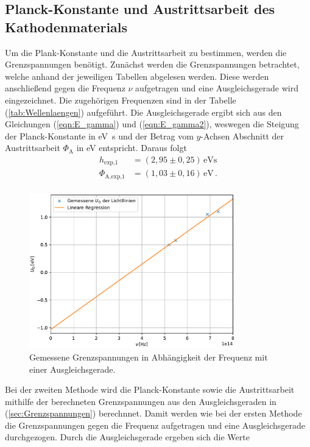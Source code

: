 \subsection{Planck-Konstante und Austrittsarbeit des Kathodenmaterials}
Um die Plank-Konstante und die Austrittsarbeit zu bestimmen, werden die Grenzspannungen benötigt.
Zunächst werden die Grenzspannungen betrachtet, welche anhand der jeweiligen Tabellen abgelesen werden. 
Diese werden anschließend gegen die Frequenz $\nu$ aufgetragen und eine Ausgleichsgerade wird eingezeichnet.
Die zugehörigen Frequenzen sind in der Tabelle (\ref{tab:Wellenlaengen}) aufgeführt.
Die Ausgleichsgerade ergibt sich aus den Gleichungen (\ref{eqn:E_gamma}) und (\ref{eqn:E_gamma2}), weswegen die Steigung der Planck-Konstante in 
\unit{\eV\second} und der Betrag vom $y$-Achsen Abschnitt der Austrittsarbeit $\Phi_{\text{A}}$ in \unit{\eV} entspricht. Daraus folgt
\begin{align*}
    h_{\text{exp,}1} &= (2,95 \pm 0,25)\,\unit{\eV\second}\\
    \Phi_{\text{A,exp,}1} &= (1,03 \pm 0,16) \, \unit{\eV}\,.\\
\end{align*}
\begin{figure}[H]
    \centering
    \includegraphics[width=0.8\textwidth]{Plots/planck_gemessen.pdf}
    \caption{Gemessene Grenzspannungen in Abhängigkeit der Frequenz mit einer Ausgleichsgerade.}
    \label{fig:Planck_gemessen}
\end{figure}
Bei der zweiten Methode wird die Planck-Konstante sowie die Austrittsarbeit mithilfe der berechneten Grenzspannungen
aus den Ausgleichsgeraden in (\ref{sec:Grenzspannungen}) berechnnet. Damit werden wie bei der ersten Methode die Grenzspannungen
gegen die Frequenz aufgetragen und eine Ausgleichsgerade durchgezogen. Durch die Ausgleichsgerade ergeben sich die Werte 
